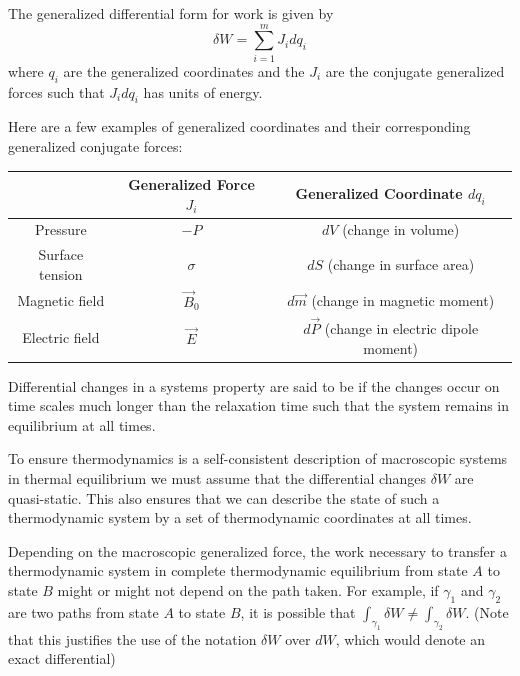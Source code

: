 \documentclass[12pt, a4paper, oneside, openright, titlepage]{book}
\begin{document}
\begin{defn}
    The generalized differential form for work is given by \begin{equation}
        \delta W = \sum_{i=1}^mJ_idq_i
    \end{equation}
    where $q_i$ are the generalized coordinates and the $J_i$ are the conjugate generalized forces such that $J_idq_i$ has units of energy.
\end{defn}

Here are a few examples of generalized coordinates and their corresponding generalized conjugate forces:

\begin{table}[H]
    \centering
    \begin{tabular}{c|c|c}
        \hline
        & Generalized Force $J_i$ & Generalized Coordinate $dq_i$ \\ \hline \hline
        Pressure & $-P$ & $dV$ (change in volume) \\ 
        Surface tension & $\sigma$ & $dS$ (change in surface area) \\
        Magnetic field & $\vec{B}_0$ & $d\vec{m}$ (change in magnetic moment) \\
        Electric field & $\vec{E}$ & $d\vec{P}$ (change in electric dipole moment) \\\hline
    \end{tabular}
\end{table}

\begin{defn}
    Differential changes in a systems property are said to be  if the changes occur on time scales much longer than the relaxation time such that the system remains in equilibrium at all times.
\end{defn}

To ensure thermodynamics is a self-consistent description of macroscopic systems in thermal equilibrium we must assume that the differential changes $\delta W$ are quasi-static. This also ensures that we can describe the state of such a thermodynamic system by a set of thermodynamic coordinates at all times.

Depending on the macroscopic generalized force, the work necessary to transfer a thermodynamic system in complete thermodynamic equilibrium from state $A$ to state $B$ might or might not depend on the path taken. For example, if $\gamma_1$ and $\gamma_2$ are two paths from state $A$ to state $B$, it is possible that $\int_{\gamma_1}\delta W \neq \int_{\gamma_2}\delta W$. (Note that this justifies the use of the notation $\delta W$ over $dW$, which would denote an exact differential)
\end{document}
